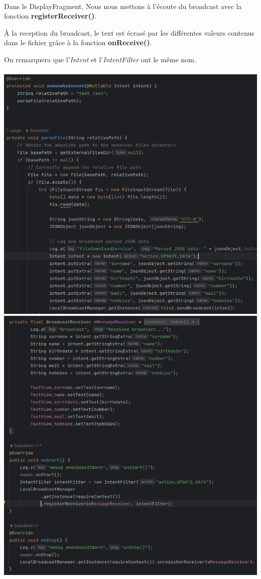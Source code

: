 \documentclass[a4paper]{article}
\begin{document}
\begin{multicols}{2}
            \paragraph{}
                Dans le DisplayFragment, Nous nous mettons à l'écoute du broadcast avec la fonction \textbf{registerReceiver()}.

                À la reception du broadcast, le text est écrasé par les différentes valeurs contenus dans le fichier grâce à la fonction \textbf{onReceive()}.
                
                On remarquera que l'\emph{Intent} et l'\emph{IntentFilter} ont le même nom.
                \\\\
                \noindent\includegraphics[width=.47\textwidth]{load/FileDownloadService}
                \noindent\includegraphics[width=.47\textwidth]{load/broadcastReceive}


\end{multicols}
\end{document}
